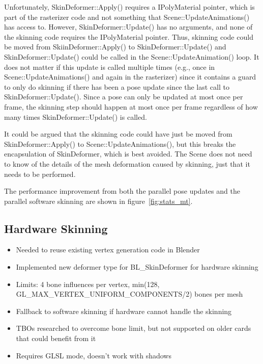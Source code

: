Unfortunately, SkinDeformer::Apply() requires a IPolyMaterial pointer, which is part of the rasterizer code and not something that Scene::UpdateAnimations() has access to.
However, SkinDeformer::Update() has no arguments, and none of the skinning code requires the IPolyMaterial pointer.
Thus, skinning code could be moved from SkiinDeformer::Apply() to SkinDeformer::Update() and SkinDeformer::Update() could be called in the Scene::UpdateAnimation() loop.
It does not matter if this update is called multiple times (e.g., once in Scene::UpdateAnimations() and again in the rasterizer) since it contains a guard to only do skinning if there has been a pose update since the last call to SkinDeformer::Update().
Since a pose can only be updated at most once per frame, the skinning step should happen at most once per frame regardless of how many times SkinDeformer::Update() is called.

It could be argued that the skinning code could have just be moved from SkinDeformer::Apply() to Scene::UpdateAnimations(), but this breaks the encapsulation of SkinDeformer, which is best avoided.
The Scene does not need to know of the details of the mesh deformation caused by skinning, just that it needs to be performed.

The performance improvement from both the parallel pose updates and the parallel software skinning are shown in figure~\ref{fig:stats_mt}.


\subsection{Hardware Skinning}
\ifsummaries
\begin{itemize}
 \item Needed to reuse existing vertex generation code in Blender
 \item Implemented new deformer type for BL\_SkinDeformer for hardware skinning
 \item Limits: 4 bone influences per vertex, min(128, GL\_MAX\_VERTEX\_UNIFORM\_COMPONENTS/2) bones per mesh
 \item Fallback to software skinning if hardware cannot handle the skinning
 \item TBOs researched to overcome bone limit, but not supported on older cards that could benefit from it
 \item Requires GLSL mode, doesn't work with shadows
\end{itemize}
\fi

